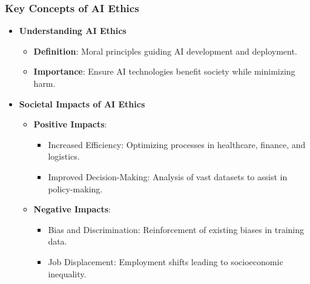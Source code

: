 \documentclass[aspectratio=169]{beamer}
\begin{document}
\begin{frame}[fragile]
    \frametitle{Key Concepts of AI Ethics}
    \begin{itemize}
        \item \textbf{Understanding AI Ethics}
            \begin{itemize}
                \item \textbf{Definition}: Moral principles guiding AI development and deployment.
                \item \textbf{Importance}: Ensure AI technologies benefit society while minimizing harm.
            \end{itemize}
        
        \item \textbf{Societal Impacts of AI Ethics}
            \begin{itemize}
                \item \textbf{Positive Impacts}:
                \begin{itemize}
                    \item Increased Efficiency: Optimizing processes in healthcare, finance, and logistics.
                    \item Improved Decision-Making: Analysis of vast datasets to assist in policy-making.
                \end{itemize}
                
                \item \textbf{Negative Impacts}:
                \begin{itemize}
                    \item Bias and Discrimination: Reinforcement of existing biases in training data.
                    \item Job Displacement: Employment shifts leading to socioeconomic inequality.
                \end{itemize}
            \end{itemize}
    \end{itemize}
\end{frame}
\end{document}
